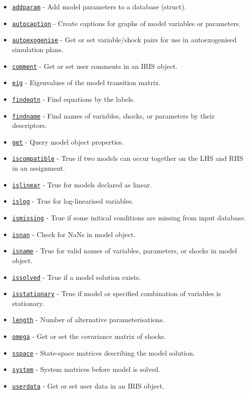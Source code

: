 \begin{itemize}
\itemsep1pt\parskip0pt
\item
  \href{model/addparam}{\texttt{addparam}} - Add model parameters to a
  database (struct).
\item
  \href{model/autocaption}{\texttt{autocaption}} - Create captions for
  graphs of model variables or parameters.
\item
  \href{model/autoexogenise}{\texttt{autoexogenise}} - Get or set
  variable/shock pairs for use in autoexogenised simulation plans.
\item
  \href{model/comment}{\texttt{comment}} - Get or set user comments in
  an IRIS object.
\item
  \href{model/eig}{\texttt{eig}} - Eigenvalues of the model transition
  matrix.
\item
  \href{model/findeqtn}{\texttt{findeqtn}} - Find equations by the
  labels.
\item
  \href{model/findname}{\texttt{findname}} - Find names of variables,
  shocks, or parameters by their descriptors.
\item
  \href{model/get}{\texttt{get}} - Query model object properties.
\item
  \href{model/iscompatible}{\texttt{iscompatible}} - True if two models
  can occur together on the LHS and RHS in an assignment.
\item
  \href{model/islinear}{\texttt{islinear}} - True for models declared as
  linear.
\item
  \href{model/islog}{\texttt{islog}} - True for log-linearised
  variables.
\item
  \href{model/ismissing}{\texttt{ismissing}} - True if some initical
  conditions are missing from input database.
\item
  \href{model/isnan}{\texttt{isnan}} - Check for NaNs in model object.
\item
  \href{model/isname}{\texttt{isname}} - True for valid names of
  variables, parameters, or shocks in model object.
\item
  \href{model/issolved}{\texttt{issolved}} - True if a model solution
  exists.
\item
  \href{model/isstationary}{\texttt{isstationary}} - True if model or
  specified combination of variables is stationary.
\item
  \href{model/length}{\texttt{length}} - Number of alternative
  parameterisations.
\item
  \href{model/omega}{\texttt{omega}} - Get or set the covariance matrix
  of shocks.
\item
  \href{model/sspace}{\texttt{sspace}} - State-space matrices describing
  the model solution.
\item
  \href{model/system}{\texttt{system}} - System matrices before model is
  solved.
\item
  \href{model/userdata}{\texttt{userdata}} - Get or set user data in an
  IRIS object.
\end{itemize}

